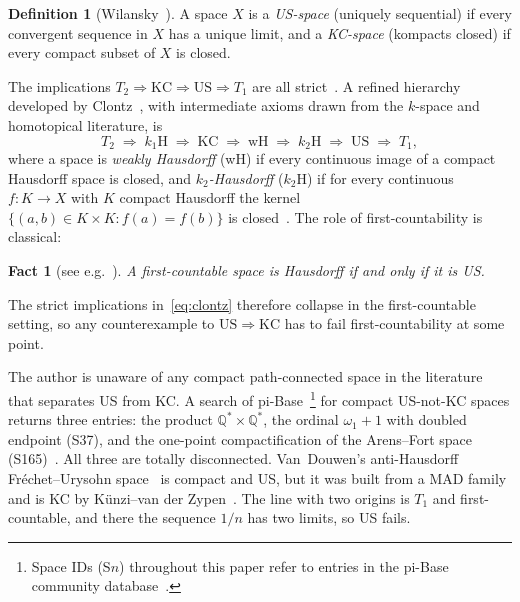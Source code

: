 \documentclass[11pt]{article}
\newtheorem{fact}[theorem]{Fact}
\theoremstyle{definition}
\newtheorem{definition}[theorem]{Definition}
\theoremstyle{remark}
\begin{document}
\begin{definition}[Wilansky~\cite{bib:wilansky}]\label{def:USKC}
A space $X$ is a \emph{US-space} (uniquely sequential) if every convergent
sequence in $X$ has a unique limit, and a \emph{KC-space} (kompacts
closed) if every compact subset of $X$ is closed.
\end{definition}

The implications $T_2 \Rightarrow \mathrm{KC} \Rightarrow \mathrm{US}
\Rightarrow T_1$ are all strict~\cite{bib:wilansky,bib:alas}.
A refined hierarchy developed by Clontz~\cite{bib:clontz}, with
intermediate axioms drawn from the $k$-space and homotopical literature,
is
\begin{equation}\label{eq:clontz}
T_2 \;\Rightarrow\; k_1\mathrm{H} \;\Rightarrow\; \mathrm{KC}
\;\Rightarrow\; \mathrm{wH} \;\Rightarrow\; k_2\mathrm{H}
\;\Rightarrow\; \mathrm{US} \;\Rightarrow\; T_1,
\end{equation}
where a space is \emph{weakly Hausdorff} (wH) if every continuous image
of a compact Hausdorff space is closed, and \emph{$k_2$-Hausdorff}
($k_2$H) if for every continuous $f\colon K \to X$ with $K$ compact
Hausdorff the kernel $\{(a,b) \in K \times K : f(a) = f(b)\}$ is
closed~\cite{bib:clontzwilliams}.
The role of first-countability is classical:

\begin{fact}[see e.g.\ {\cite[p.~60]{bib:goreham}}]\label{fact:firstUS}
A first-countable space is Hausdorff if and only if it is US.
\end{fact}

The strict implications in~\eqref{eq:clontz} therefore collapse in
the first-countable setting, so any counterexample to
$\mathrm{US} \Rightarrow \mathrm{KC}$ has to fail first-countability at
some point.

The author is unaware of any compact path-connected space in the
literature that separates US from KC.
A search of pi-Base~\cite{bib:pibase}\footnote{Space IDs (S$n$)
throughout this paper refer to entries in the pi-Base community
database~\cite{bib:pibase}.} for compact US-not-KC spaces returns
three entries: the product $\mathbb{Q}^{\ast} \times \mathbb{Q}^{\ast}$,
the ordinal $\omega_1{+}1$ with doubled endpoint (S37), and the
one-point compactification of the Arens--Fort space
(S165)~\cite{bib:clontz}.
All three are totally disconnected.
Van~Douwen's anti-Hausdorff Fr\'{e}chet--Urysohn
space~\cite{bib:vandouwen} is compact and US, but it was built from a
MAD family and is KC by K\"{u}nzi--van der Zypen~\cite{bib:kunzi}.
The line with two origins is $T_1$ and first-countable, and there the
sequence $1/n$ has two limits, so US fails.
\end{document}
